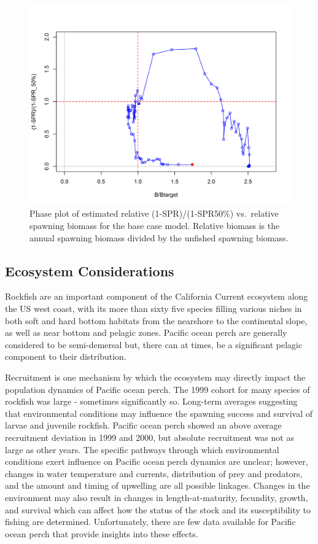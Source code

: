 \documentclass[12pt,]{article}
\begin{document}
\begin{figure}
\centering
\includegraphics{r4ss/plots_mod1/SPR4_phase.png}
\caption{Phase plot of estimated relative (1-SPR)/(1-SPR50\%)
vs.~relative spawning biomass for the base case model. Relative biomass
is the annual spawning biomass divided by the unfished spawning biomass.
\label{fig:Phase_all}}
\end{figure}

\FloatBarrier

\subsection*{Ecosystem Considerations}\label{ecosystem-considerations}

Rockfish are an important component of the California Current ecosystem
along the US west coast, with its more than sixty five species filling
various niches in both soft and hard bottom habitats from the nearshore
to the continental slope, as well as near bottom and pelagic zones.
Pacific ocean perch are generally considered to be semi-demersal but,
there can at times, be a significant pelagic component to their
distribution.

Recruitment is one mechanism by which the ecosystem may directly impact
the population dynamics of Pacific ocean perch. The 1999 cohort for many
species of rockfish was large - sometimes significantly so. Long-term
averages suggesting that environmental conditions may influence the
spawning success and survival of larvae and juvenile rockfish. Pacific
ocean perch showed an above average recruitment deviation in 1999 and
2000, but absolute recruitment was not as large as other years. The
specific pathways through which environmental conditions exert influence
on Pacific ocean perch dynamics are unclear; however, changes in water
temperature and currents, distribution of prey and predators, and the
amount and timing of upwelling are all possible linkages. Changes in the
environment may also result in changes in length-at-maturity, fecundity,
growth, and survival which can affect how the status of the stock and
its susceptibility to fishing are determined. Unfortunately, there are
few data available for Pacific ocean perch that provide insights into
these effects.
\end{document}
